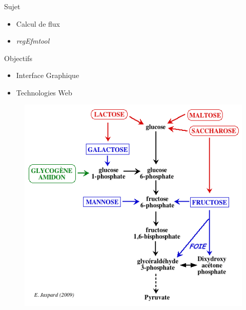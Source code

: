 \documentclass[11pt]{beamer}
\begin{document}
\begin{frame}
	\frametitle{\secname}
	\begin{minipage}{5cm}
	\begin{block}{Sujet}
		\begin{itemize}
		\item Calcul de flux
		\item \textit{regEfmtool}
		\end{itemize}
	\end{block}
	\begin{block}{Objectifs}
		\begin{itemize}
		\item Interface Graphique
		\item Technologies Web
		\end{itemize}
	\end{block}
	\end{minipage}
	\begin{minipage}{5cm}
	\begin{figure}[h]
			\begin{center}
   				\begin{minipage}[c]{0.9\textwidth}
  					\includegraphics[scale=0.3]{pyruvate.png}
				 \end{minipage}%
  			\end{center}	
		 \end{figure}
	\end{minipage}
\end{frame}
\end{document}
